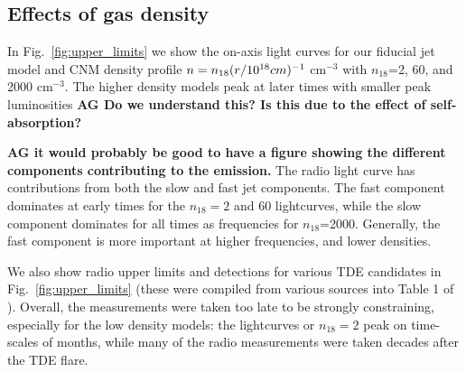 \documentclass[usenatbib,fleqn]{mnras}
\begin{document}
\subsection{Effects of gas density}

In Fig.~\ref{fig:upper_limits} we show the on-axis light curves for
our fiducial jet model and CNM density profile $n=n_{18} (r/10^{18}
{\rm} cm)^{-1}$ cm$^{-3}$ with $n_{18}$=2, 60, and 2000 cm$^{-3}$. The
higher density models peak at later times with smaller peak
luminosities {\bf AG Do we understand this? Is this due to the effect
  of self-absorption?}

{\bf AG it would probably be good to have a figure showing the
  different components contributing to the emission.} The radio light
curve has contributions from both the slow and fast jet
components. The fast component dominates at
early times for the $n_{18}=2$ and 60 lightcurves, while the slow
component dominates for all times as frequencies for
$n_{18}$=2000. Generally, the fast component is more important at
higher frequencies, and lower densities.

We also show radio upper limits and detections for various TDE
candidates in Fig.~\ref{fig:upper_limits} (these were compiled from
various sources into Table 1 of \citealt{Mimica+2015}). Overall, the
measurements were taken too late to be strongly constraining,
especially for the low density models: the lightcurves or $n_{18}=2$
peak on time-scales of months, while many of the radio measurements
were taken decades after the TDE flare.
\end{document}
